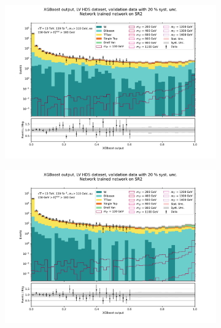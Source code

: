 \documentclass[12pt, a4paper]{book}
\begin{document}
\begin{figure}[!ht]
	\centering
	\begin{subfigure}[b]{0.49\textwidth}
      \centering
      \includegraphics[width=1\textwidth]{XGBoost/Model_independent/100-150/LV_HDS/VAL_ee.pdf}
   \end{subfigure}
   \hfill
   \begin{subfigure}[b]{0.49\textwidth}
      \centering
      \includegraphics[width=1\textwidth]{XGBoost/Model_independent/100-150/LV_HDS/VAL_uu.pdf}
   \end{subfigure}
   \hfill
   \begin{subfigure}[b]{0.49\textwidth}
      \centering

\end{subfigure}
\end{figure}
\end{document}
